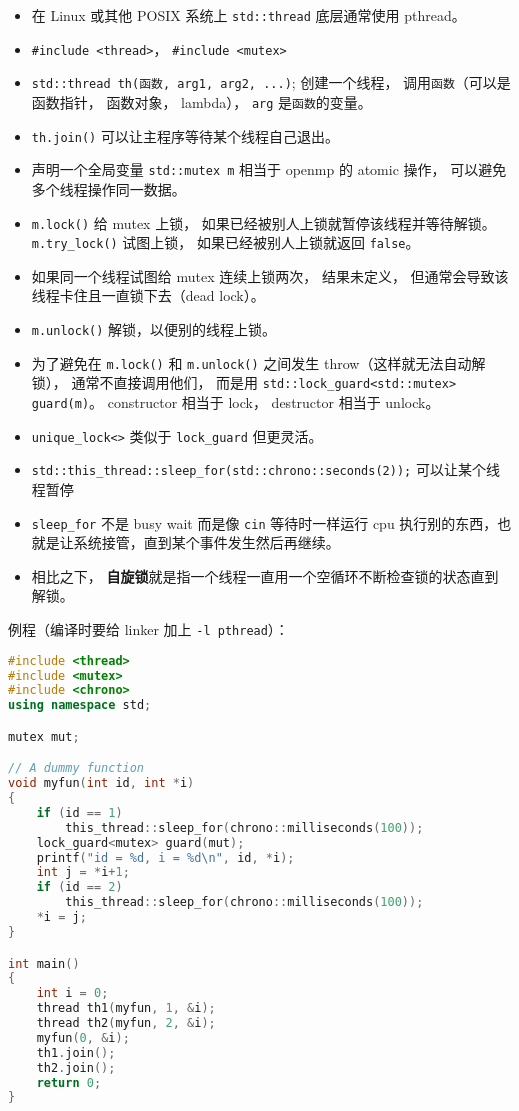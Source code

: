 
\begin{itemize}
\item 在 Linux 或其他 POSIX 系统上 \verb|std::thread| 底层通常使用 pthread。
\item \verb|#include <thread>|， \verb|#include <mutex>|
\item \verb|std::thread th(函数, arg1, arg2, ...)|; 创建一个线程， 调用\verb|函数|（可以是函数指针， 函数对象， lambda）， \verb|arg| 是\verb|函数|的变量。
\item \verb|th.join()| 可以让主程序等待某个线程自己退出。
\item 声明一个全局变量 \verb|std::mutex m| 相当于 openmp 的 atomic 操作， 可以避免多个线程操作同一数据。
\item \verb|m.lock()| 给 mutex 上锁， 如果已经被别人上锁就暂停该线程并等待解锁。 \verb|m.try_lock()| 试图上锁， 如果已经被别人上锁就返回 \verb|false|。
\item 如果同一个线程试图给 mutex 连续上锁两次， 结果未定义， 但通常会导致该线程卡住且一直锁下去（dead lock）。
\item \verb|m.unlock()| 解锁，以便别的线程上锁。
\item 为了避免在 \verb|m.lock()| 和 \verb|m.unlock()| 之间发生 throw（这样就无法自动解锁）， 通常不直接调用他们， 而是用 \verb|std::lock_guard<std::mutex> guard(m)|。 constructor 相当于 lock， destructor 相当于 unlock。
\item \verb`unique_lock<>` 类似于 \verb`lock_guard` 但更灵活。
\item \verb|std::this_thread::sleep_for(std::chrono::seconds(2));| 可以让某个线程暂停
\item \verb`sleep_for` 不是 busy wait 而是像 \verb`cin` 等待时一样运行 cpu 执行别的东西，也就是让系统接管，直到某个事件发生然后再继续。
\item 相比之下， \textbf{自旋锁}就是指一个线程一直用一个空循环不断检查锁的状态直到解锁。
\end{itemize}

例程（编译时要给 linker 加上 \verb|-l pthread|）：
\begin{lstlisting}[language=cpp]
#include <thread>
#include <mutex>
#include <chrono>
using namespace std;

mutex mut;

// A dummy function
void myfun(int id, int *i)
{
    if (id == 1)
        this_thread::sleep_for(chrono::milliseconds(100));
    lock_guard<mutex> guard(mut);
    printf("id = %d, i = %d\n", id, *i);
    int j = *i+1;
    if (id == 2)
        this_thread::sleep_for(chrono::milliseconds(100));
    *i = j;
}

int main()
{
    int i = 0;
    thread th1(myfun, 1, &i);
    thread th2(myfun, 2, &i);
    myfun(0, &i);
    th1.join();
    th2.join();
    return 0;
}
\end{lstlisting}

